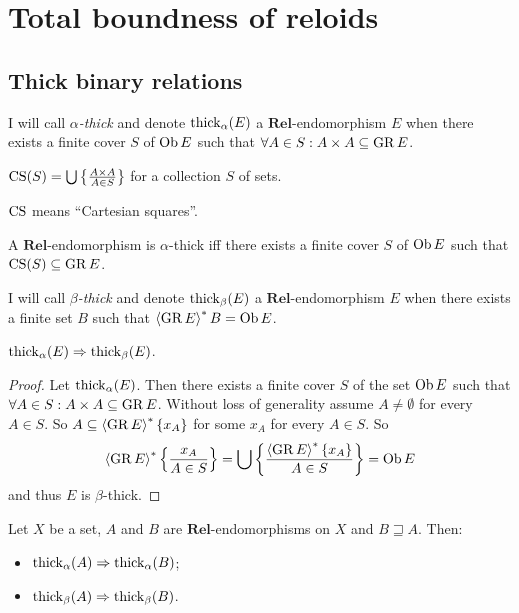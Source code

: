 
\chapter{Total boundness of reloids}


\section{Thick binary relations}
\begin{defn}
I will call \emph{$\alpha$-thick} and denote $\operatorname{thick}_{\alpha}(E)$
a $\mathbf{Rel}$-endomorphism $E$ when there exists a finite cover $S$
of $\operatorname{Ob} E$ such that $\forall A\in S:A\times A\subseteq\operatorname{GR} E$.
\end{defn}

\begin{defn}
$\operatorname{CS}(S)=\bigcup\left\{ \frac{A\times A}{A\in S}\right\}$ for a collection $S$
of sets.\end{defn}
\begin{rem}
$\operatorname{CS}$ means ``Cartesian squares''.\end{rem}
\begin{obvious}
A $\mathbf{Rel}$-endomorphism is $\alpha$-thick iff there exists
a finite cover $S$ of $\operatorname{Ob} E$ such that $\operatorname{CS}(S)\subseteq\operatorname{GR} E$.\end{obvious}
\begin{defn}
I will call \emph{$\beta$-thick} and denote $\operatorname{thick}_{\beta}(E)$
a $\mathbf{Rel}$-endomorphism $E$ when there exists a finite set
$B$ such that $\left\langle \operatorname{GR} E\right\rangle ^{\ast}B=\operatorname{Ob} E$.\end{defn}
\begin{prop}
$\operatorname{thick}_{\alpha}(E)\Rightarrow\operatorname{thick}_{\beta}(E)$.\end{prop}
\begin{proof}
Let $\operatorname{thick}_{\alpha}(E)$. Then there exists a finite cover $S$ of
the set $\operatorname{Ob} E$ such that $\forall A\in S:A\times A\subseteq\operatorname{GR} E$.
Without loss of generality assume $A\ne\emptyset$ for every $A\in S$.
So $A\subseteq\left\langle \operatorname{GR} E\right\rangle ^{\ast}\{x_{A}\}$ for some $x_{A}$ for every
$A\in S$. So
\[
\left\langle \operatorname{GR} E\right\rangle ^{\ast}\left\{ \frac{x_{A}}{A\in S}\right\}=\bigcup\left\{ \frac{\left\langle \operatorname{GR} E\right\rangle ^{\ast}\{x_{A}\}}{A\in S}\right\}=\operatorname{Ob} E
\]
and thus $E$ is $\beta$-thick.\end{proof}
\begin{obvious}
Let $X$ be a set, $A$ and $B$ are $\mathbf{Rel}$-endomorphisms
on $X$ and $B\sqsupseteq A$. Then:
\begin{itemize}
\item $\operatorname{thick}_{\alpha}(A)\Rightarrow\operatorname{thick}_{\alpha}(B)$;
\item $\operatorname{thick}_{\beta}(A)\Rightarrow\operatorname{thick}_{\beta}(B)$.
\end{itemize}
\end{obvious}
